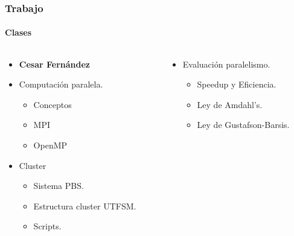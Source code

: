 \frame
{
\frametitle{Trabajo}
\framesubtitle{Clases}

	\begin{columns}
	 	\begin{column}{0.5\textwidth}
			\begin{itemize}
				\item \textbf{Cesar Fernández}
				\item Computación paralela.
				\begin{itemize}
					\item Conceptos
					\item MPI
					\item OpenMP
				\end{itemize}
				\item Cluster
				\begin{itemize}
					\item Sistema PBS.
					\item Estructura cluster UTFSM.
					\item Scripts.
				\end{itemize}
				\end{itemize}
	 	\end{column}
	 	\begin{column}{0.5\textwidth}
			\begin{itemize}
				\item Evaluación paralelismo.
				\begin{itemize}
					\item Speedup y Eficiencia.
					\item Ley de Amdahl's.
					\item Ley de Gustafson-Barsis.
				\end{itemize}
			\end{itemize}
	 	\end{column}
	\end{columns}
}
